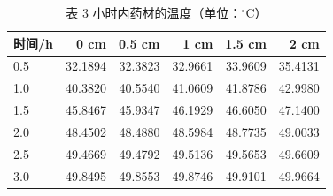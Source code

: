 \begin{table}[H]
\centering
\caption{表 3 小时内药材的温度（单位：$^\circ$C）}
\label{tab:p2T}
\small
\begin{tabular}{@{}lrrrrr@{}}
\toprule
时间/h & 0 cm & 0.5 cm & 1 cm & 1.5 cm & 2 cm \\
\midrule
0.5 & 32.1894 & 32.3823 & 32.9661 & 33.9609 & 35.4131 \\
1.0 & 40.3820 & 40.5540 & 41.0609 & 41.8786 & 42.9980 \\
1.5 & 45.8467 & 45.9347 & 46.1929 & 46.6050 & 47.1400 \\
2.0 & 48.4502 & 48.4880 & 48.5984 & 48.7735 & 49.0033 \\
2.5 & 49.4669 & 49.4792 & 49.5136 & 49.5653 & 49.6609 \\
3.0 & 49.8495 & 49.8553 & 49.8746 & 49.9101 & 49.9664 \\
\bottomrule
\end{tabular}
\end{table}
